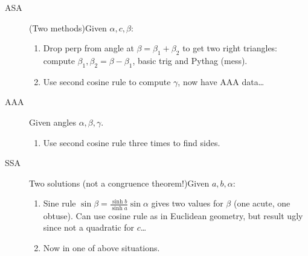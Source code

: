 \begin{description}
	\item[ASA] (Two methods)\lstsp Given $\alpha,c,\beta$:
	\begin{enumerate}
	  \item Drop perp from angle at $\beta=\beta_1+\beta_2$ to get two right triangles: compute $\beta_1,\beta_2=\beta-\beta_1$, basic trig and Pythag (mess).
	  \item Use second cosine rule to compute $\gamma$, now have AAA data\ldots
	\end{enumerate}
	
	\item[AAA] \lstsp Given angles $\alpha,\beta,\gamma$.
	\begin{enumerate}
	  \item Use second cosine rule three times to find sides.
	\end{enumerate}
	  
	\item[SSA] Two solutions (not a congruence theorem!)\lstsp Given $a,b,\alpha$:
	\begin{enumerate}
	  \item Sine rule $\sin\beta=\frac{\sinh b}{\sinh a}\sin\alpha$ gives two values for $\beta$ (one acute, one obtuse). Can use cosine rule as in Euclidean geometry, but result ugly since not a quadratic for $c$\ldots
	  \item Now in one of above situations.
	\end{enumerate}
\end{description}